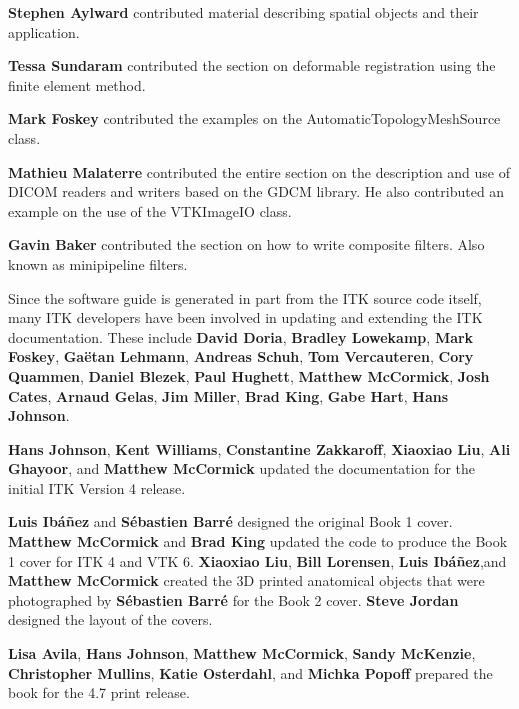 {\bf Stephen Aylward} contributed material describing spatial objects and
their application.

{\bf Tessa Sundaram} contributed the section on deformable registration using
the finite element method.

{\bf Mark Foskey} contributed the examples on the
AutomaticTopologyMeshSource class.

{\bf Mathieu Malaterre} contributed the entire section on the description and
use of DICOM readers and writers based on the GDCM library. He also contributed
an example on the use of the VTKImageIO class.

{\bf Gavin Baker} contributed the section on how to write composite filters.
Also known as minipipeline filters.

Since the software guide is generated in part from the ITK source code
itself, many ITK developers have been involved in updating and
extending the ITK documentation.  These include {\bf David Doria},
{\bf Bradley Lowekamp}, {\bf Mark Foskey}, {\bf Ga\"{e}tan Lehmann},
{\bf Andreas Schuh}, {\bf Tom Vercauteren}, {\bf Cory Quammen}, {\bf Daniel Blezek},
{\bf Paul Hughett}, {\bf Matthew McCormick}, {\bf Josh Cates}, {\bf Arnaud Gelas},
{\bf Jim Miller}, {\bf Brad King}, {\bf Gabe Hart}, {\bf Hans Johnson}.

{\bf Hans Johnson}, {\bf Kent Williams}, {\bf Constantine Zakkaroff}, {\bf
Xiaoxiao Liu}, {\bf Ali Ghayoor}, and {\bf Matthew McCormick} updated
the documentation for the initial ITK Version 4 release.

{\bf Luis Ib\'{a}\~{n}ez} and {\bf S\'{e}bastien Barr\'{e}} designed the
original Book 1 cover. {\bf Matthew McCormick} and {\bf Brad King} updated the
code to produce the Book 1 cover for ITK 4 and VTK 6. {\bf Xiaoxiao Liu},
{\bf Bill Lorensen}, {\bf Luis Ib\'{a}\~{n}ez},and {\bf Matthew McCormick}
created the 3D printed anatomical objects that were photographed by {\bf
S\'{e}bastien Barr\'{e}} for the Book 2 cover. {\bf Steve Jordan} designed the
layout of the covers.

{\bf Lisa Avila}, {\bf Hans Johnson}, {\bf Matthew McCormick}, {\bf Sandy
McKenzie}, {\bf Christopher Mullins}, {\bf Katie Osterdahl}, and {\bf Michka
Popoff} prepared the book for the 4.7 print release.
